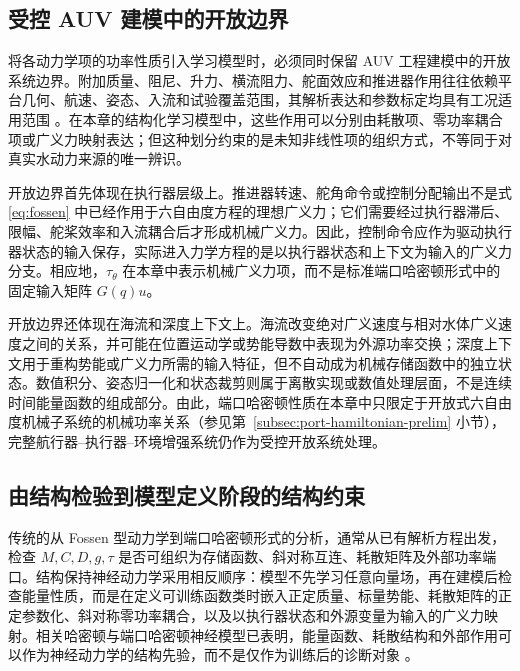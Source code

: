 \documentclass[UTF8,zihao=-4]{ctexrep}
\begin{document}
\subsection{受控 AUV 建模中的开放边界}

将各动力学项的功率性质引入学习模型时，必须同时保留 AUV 工程建模中的开放系统边界。附加质量、阻尼、升力、横流阻力、舵面效应和推进器作用往往依赖平台几何、航速、姿态、入流和试验覆盖范围，其解析表达和参数标定均具有工况适用范围 \citep{panda2021hydrodynamicreview,ahmed2023hydrodynamiccoefficients}。在本章的结构化学习模型中，这些作用可以分别由耗散项、零功率耦合项或广义力映射表达；但这种划分约束的是未知非线性项的组织方式，不等同于对真实水动力来源的唯一辨识。

开放边界首先体现在执行器层级上。推进器转速、舵角命令或控制分配输出不是式 \eqref{eq:fossen} 中已经作用于六自由度方程的理想广义力；它们需要经过执行器滞后、限幅、舵桨效率和入流耦合后才形成机械广义力。因此，控制命令应作为驱动执行器状态的输入保存，实际进入力学方程的是以执行器状态和上下文为输入的广义力分支。相应地，\(\tau_\theta\) 在本章中表示机械广义力项，而不是标准端口哈密顿形式中的固定输入矩阵 \(G(q)u\)。

开放边界还体现在海流和深度上下文上。海流改变绝对广义速度与相对水体广义速度之间的关系，并可能在位置运动学或势能导数中表现为外源功率交换；深度上下文用于重构势能或广义力所需的输入特征，但不自动成为机械存储函数中的独立状态。数值积分、姿态归一化和状态裁剪则属于离散实现或数值处理层面，不是连续时间能量函数的组成部分。由此，端口哈密顿性质在本章中只限定于开放式六自由度机械子系统的机械功率关系（参见第~\ref{subsec:port-hamiltonian-prelim} 小节），完整航行器--执行器--环境增强系统仍作为受控开放系统处理。

\subsection{由结构检验到模型定义阶段的结构约束}

传统的从 Fossen 型动力学到端口哈密顿形式的分析，通常从已有解析方程出发，检查 \(M,C,D,g,\tau\) 是否可组织为存储函数、斜对称互连、耗散矩阵及外部功率端口。结构保持神经动力学采用相反顺序：模型不先学习任意向量场，再在建模后检查能量性质，而是在定义可训练函数类时嵌入正定质量、标量势能、耗散矩阵的正定参数化、斜对称零功率耦合，以及以执行器状态和外源变量为输入的广义力映射。相关哈密顿与端口哈密顿神经模型已表明，能量函数、耗散结构和外部作用可以作为神经动力学的结构先验，而不是仅作为训练后的诊断对象 \citep{greydanus2019hamiltonian,desai2021porthamiltonian,eidnes2023pseudohamiltonian,cherifi2020overviewphml}。
\end{document}
